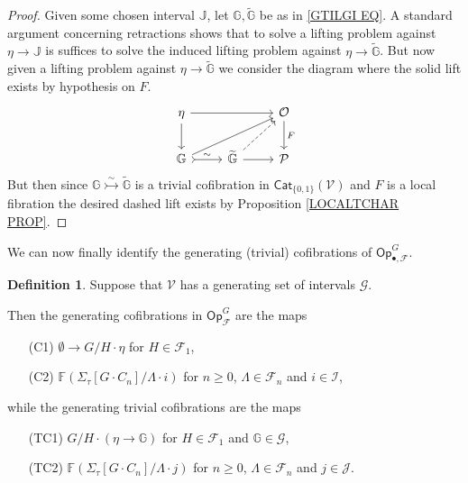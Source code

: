 \documentclass[a4paper,10pt
,draft
]{article}%
\numberwithin{equation}{section}
\numberwithin{figure}{section}
\theoremstyle{definition} %
\newtheorem{definition}[equation]{Definition}%
\newtheorem{remark}[equation]{Remark}%
\newcommand{\F}{\ensuremath{\mathcal F}}
\newcommand{\V}{\ensuremath{\mathcal V}}
\renewcommand{\O}{\ensuremath{\mathcal O}}
\renewcommand{\P}{\ensuremath{\mathcal P}}
\newcommand{\1}{\ensuremath{\mathbbm 1}}%
\begin{document}
\begin{proof}
Given some chosen interval $\mathbb{J}$,
let $\mathbb{G}, \widetilde{\mathbb{G}}$
be as in \eqref{GTILGI EQ}.
A standard argument concerning retractions shows that to solve a lifting problem against $\eta \to \mathbb{J}$
is suffices to solve the induced lifting problem against
$\eta \to \widetilde{\mathbb{G}}$.
But now given a lifting problem against 
$\eta \to \widetilde{\mathbb{G}}$
we consider the diagram where the solid lift exists by hypothesis on $F$.
\[
\begin{tikzcd}
	\eta \ar{d} \ar{rr}  
&&
	\O 	\ar{d}{F}
\\
	\mathbb{G} \ar[rightarrowtail]{r}{\sim} \ar{rru}
&
	\widetilde{\mathbb{G}} \ar{r} \ar[dashed]{ru}
&
	\P
\end{tikzcd}
\]
But then since $\mathbb{G} \overset{\sim}{\rightarrowtail} \widetilde{\mathbb{G}}$
is a trivial cofibration in $\mathsf{Cat}_{\{0,1\}}(\V)$
and $F$ is a local fibration
the desired dashed lift exists
by Proposition \ref{LOCALTCHAR PROP}.
\end{proof}


We can now finally identify the generating (trivial) cofibrations of
$\mathsf{Op}^G_{\bullet,\F}$.


\begin{definition}\label{OPGENCOF DEF}
Suppose that $\V$ has a generating set of intervals $\mathscr{G}$.

Then the generating cofibrations in $\mathsf{Op}^G_{\F}$
are the maps
\begin{itemize}
\item[(C1)] $\emptyset \to G/H \cdot \eta$ for $H \in \F_1$,
\item[(C2)] $\mathbb{F} \left( \Sigma_{\tau}[G \cdot C_n]/\Lambda \cdot i\right)$
for $n \geq 0$, $\Lambda \in \F_n$ and $i \in \mathcal{I}$,
\end{itemize}
while the generating trivial cofibrations are the maps 
\begin{itemize}
\item[(TC1)] 
$G/H \cdot \left(\eta \to \mathbb{G}\right)$ for $H \in \F_1$ and $\mathbb{G} \in \mathscr{G}$,
\item[(TC2)] 
$\mathbb{F} \left( \Sigma_{\tau}[G \cdot C_n]/\Lambda \cdot j\right)$
for $n \geq 0$, $\Lambda \in \F_n$ and $j \in \mathcal{J}$.
\end{itemize}
\end{definition}


\end{document}
